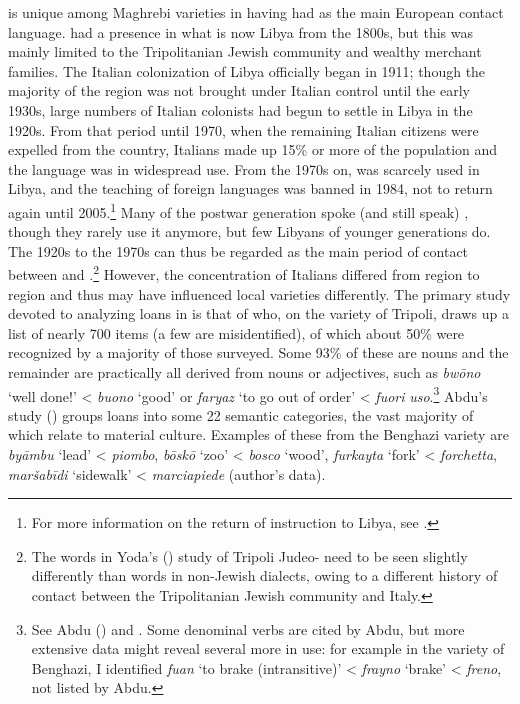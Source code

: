 \documentclass[output=paper]{langsci/langscibook}
\begin{document}
   is unique among Maghrebi varieties in having had  as the main European contact language.  had a presence in what is now Libya from the 1800s, but this was mainly limited to the Tripolitanian Jewish community and wealthy merchant families. The Italian colonization of Libya officially began in 1911; though the majority of the region was not brought under Italian control until the early 1930s, large numbers of Italian colonists had begun to settle in Libya in the 1920s. From that period until 1970, when the remaining Italian citizens were expelled from the country, Italians made up 15\% or more of the population and the language was in widespread use. From the 1970s on,  was scarcely used in Libya, and the teaching of foreign languages was banned in 1984, not to return again until 2005.\footnote{For more information on the return of  instruction to Libya, see \citet{Danna2018phonetic}.} Many of the postwar generation spoke (and still speak) , though they rarely use it anymore, but few Libyans of younger generations do. The 1920s to the 1970s can thus be regarded as the main period of contact between  and .\footnote{The  words in Yoda’s (\citeyear{Yoda2005}) study of Tripoli Judeo- need to be seen slightly differently than  words in non-Jewish dialects, owing to a different history of contact between the Tripolitanian Jewish community and Italy.} However, the concentration of Italians differed from region to region and thus may have influenced local varieties differently. The primary study devoted to analyzing  loans in  is that of \citet{Abdu1988} who,  on the variety of Tripoli, draws up a list of nearly 700 items (a few are misidentified), of which about 50\% were recognized by a majority of those surveyed. Some 93\% of these are nouns and the remainder are practically all derived from nouns or adjectives, such as \textit{bwōno} ‘well done!’ < \textit{buono} ‘good’ or \textit{faryaz} ‘to go out of order’ <  \textit{fuori} \textit{uso}.\footnote{See Abdu (\citeyear[271]{Abdu1988}) and \citet{Danna2018phonetic}. Some denominal verbs are cited by Abdu, but more extensive data might reveal several more in use: for example in the variety of Benghazi, I identified \textit{fu{\R}an}  ‘to brake (intransitive)’ < \textit{frayno} ‘brake’ <  \textit{freno}, not listed by Abdu.} Abdu’s study (\citeyear[248–268]{Abdu1988}) groups  loans into some 22 semantic categories, the vast majority of which relate to material culture. Examples of these from the Benghazi variety are \textit{byāmbu} ‘lead’ < \textit{piombo}, \textit{bōskō} ‘zoo’ < \textit{bosco} `wood', \textit{furkayta} ‘fork’ < \textit{forchetta}, \textit{maršabīdi} ‘sidewalk’ < \textit{marciapiede} (author’s data).
\end{document}

